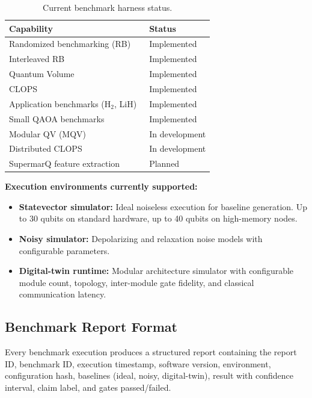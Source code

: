 \documentclass[conference]{IEEEtran}
\begin{document}
\begin{table}[H]
\centering
\caption{Current benchmark harness status.}
\label{tab:harness}
\begin{tabular}{@{}l l@{}}
\toprule
\textbf{Capability} & \textbf{Status} \\
\midrule
Randomized benchmarking (RB)~\cite{knill2008} & Implemented \\
Interleaved RB~\cite{magesan2012} & Implemented \\
Quantum Volume~\cite{cross2019} & Implemented \\
CLOPS~\cite{wack2021} & Implemented \\
Application benchmarks (H$_2$, LiH)~\cite{lubinski2023} & Implemented \\
Small QAOA benchmarks & Implemented \\
Modular QV (MQV) & In development \\
Distributed CLOPS & In development \\
SupermarQ feature extraction~\cite{tomesh2022} & Planned \\
\bottomrule
\end{tabular}
\end{table}

\textbf{Execution environments currently supported:}

\begin{itemize}[leftmargin=*]
\item \textbf{Statevector simulator:} Ideal noiseless execution for baseline generation. Up to 30 qubits on standard hardware, up to 40 qubits on high-memory nodes.
\item \textbf{Noisy simulator:} Depolarizing and relaxation noise models with configurable parameters.
\item \textbf{Digital-twin runtime:} Modular architecture simulator with configurable module count, topology, inter-module gate fidelity, and classical communication latency.
\end{itemize}

\subsection{Benchmark Report Format}

Every benchmark execution produces a structured report containing the report ID, benchmark ID, execution timestamp, software version, environment, configuration hash, baselines (ideal, noisy, digital-twin), result with confidence interval, claim label, and gates passed/failed.
\end{document}
